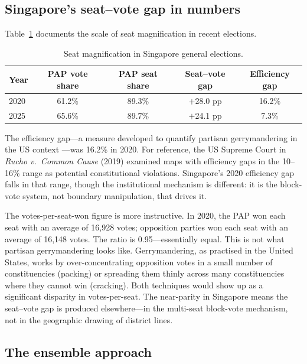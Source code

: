 \documentclass[12pt]{article}
\begin{document}
\subsection{Singapore's seat--vote gap in numbers}

Table~\ref{tab:seatvote} documents the scale of seat magnification in recent elections.

\begin{table}[h]
\centering
\caption{Seat magnification in Singapore general elections.}
\label{tab:seatvote}
\begin{tabular}{lcccc}
\toprule
Year & PAP vote share & PAP seat share & Seat--vote gap & Efficiency gap \\
\midrule
2020 & 61.2\% & 89.3\% & $+$28.0 pp & 16.2\% \\
2025 & 65.6\% & 89.7\% & $+$24.1 pp & 7.3\% \\
\bottomrule
\end{tabular}
\end{table}

The efficiency gap---a measure developed to quantify partisan gerrymandering in the US
context \citep{mcghee2014}---was 16.2\% in 2020. For reference, the US Supreme Court in
\textit{Rucho v.\ Common Cause} (2019) examined maps with efficiency gaps in the 10--16\% range
as potential constitutional violations. Singapore's 2020 efficiency gap falls in that range,
though the institutional mechanism is different: it is the block-vote system, not boundary
manipulation, that drives it.

The votes-per-seat-won figure is more instructive. In 2020, the PAP won each seat with an average
of 16,928 votes; opposition parties won each seat with an average of 16,148 votes. The ratio is
0.95---essentially equal. This is not what partisan gerrymandering looks like. Gerrymandering, as
practised in the United States, works by over-concentrating opposition votes in a small number of
constituencies (packing) or spreading them thinly across many constituencies where they cannot win
(cracking). Both techniques would show up as a significant disparity in votes-per-seat. The
near-parity in Singapore means the seat--vote gap is produced elsewhere---in the multi-seat
block-vote mechanism, not in the geographic drawing of district lines.

\subsection{The ensemble approach}
\end{document}
